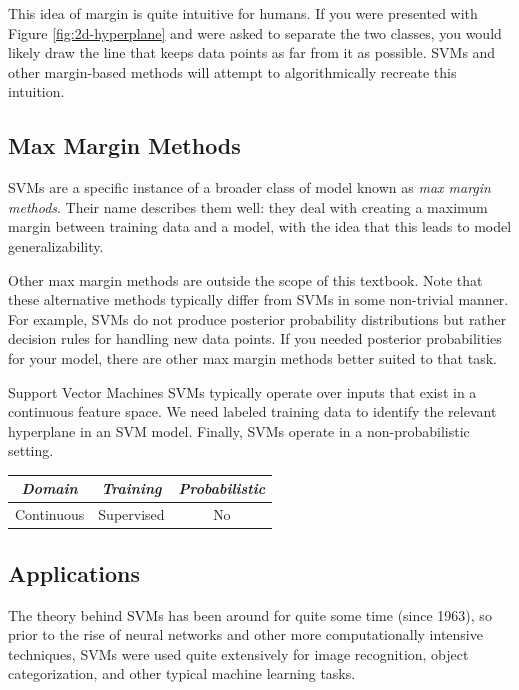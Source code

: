 This idea of margin is quite intuitive for humans. If you were presented with Figure \ref{fig:2d-hyperplane} and were asked to separate the two classes, you would likely draw the line that keeps data points as far from it as possible. SVMs and other margin-based methods will attempt to algorithmically recreate this intuition.

\subsection{Max Margin Methods}
SVMs are a specific instance of a broader class of model known as \textit{max margin methods}. Their name describes them well: they deal with creating a maximum margin between training data and a model, with the idea that this leads to model generalizability. 

Other max margin methods are outside the scope of this textbook. Note that these alternative methods typically differ from SVMs in some non-trivial manner. For example, SVMs do not produce posterior probability distributions but rather decision rules for handling new data points. If you needed posterior probabilities for your model, there are other max margin methods better suited to that task.

\begin{mlcube}{Support Vector Machines}
SVMs typically operate over inputs that exist in a continuous feature space. We need labeled training data to identify the relevant hyperplane in an SVM model. Finally, SVMs operate in a non-probabilistic setting.
\begin{center}
    \begin{tabular}{c|c|c}
    \textit{\textbf{Domain}} & \textit{\textbf{Training}} & \textit{\textbf{Probabilistic}} \\
    \hline
    Continuous & Supervised & No \\
    \end{tabular}
\end{center}
\end{mlcube}

\subsection{Applications}
The theory behind SVMs has been around for quite some time (since 1963), so prior to the rise of neural networks and other more computationally intensive techniques, SVMs were used quite extensively for image recognition, object categorization, and other typical machine learning tasks.

